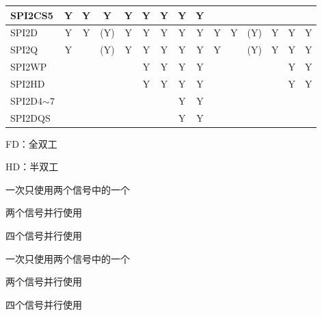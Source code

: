 \documentclass[main\_\_CN.tex]{subfiles}
\begin{document}
\begin{landscape}
\begin{table}[H]
\begin{threeparttable}
\begin{tabular}{ |p{2.0cm} |c|c|c|c|c|c|c|c|c|c|c|c|c|c| }
SPI2CS5                  & Y       & Y       & Y       & Y       & Y       & Y      & Y       & Y      &         &        &         &         &         &        \\ \hline
SPI2D                    & Y       & Y       & (Y)\tnote{3}      & Y\tnote{4}      & Y\tnote{5}      & Y      & Y       & Y      & Y       & Y      & (Y)\tnote{6}      & Y\tnote{7}     & Y\tnote{8}     & Y      \\ \hline
SPI2Q                    & Y       &         & (Y)\tnote{3}      & Y\tnote{4}      & Y\tnote{5}      & Y       & Y      & Y      & Y       &        & (Y)\tnote{6}     & Y\tnote{7}     & Y\tnote{8}      & Y      \\ \hline
SPI2WP                   &         &         &         &         & Y\tnote{5}      & Y       & Y      & Y      &         &        &         &         & Y\tnote{8}       & Y      \\ \hline
SPI2HD                   &         &         &         &         & Y\tnote{5}      & Y       & Y      & Y      &         &        &         &         & Y\tnote{8}       & Y      \\ \hline
SPI2D4$\sim$7 &         &         &         &         &       &        & Y      & Y      &         &        &         &         &        &      \\ \hline
SPI2DQS &         &         &         &         &       &        & Y      & Y      &         &        &         &         &        &      \\ \hline
\end{tabular}

                \begin{tablenotes}
                \item[1] FD：全双工
                \item[2] HD：半双工
                \item[3] 一次只使用两个信号中的一个
                \item[4] 两个信号并行使用
                \item[5] 四个信号并行使用
                \item[6] 一次只使用两个信号中的一个
                \item[7] 两个信号并行使用
                \item[8] 四个信号并行使用
        \end{tablenotes}
     \end{threeparttable}
    \end{table}


\end{landscape}
\end{document}
